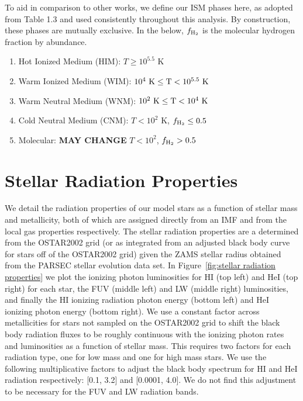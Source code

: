 \documentclass[twocolumn]{aastex61}
\begin{document}
To aid in comparison to other works, we define our ISM phases here, as adopted from \citet{Draine2011} Table 1.3 and used consistently throughout this analysis. By construction, these phases are mutually exclusive. In the below, $f_{\rm H_2}$ is the molecular hydrogen fraction by abundance.

\begin{enumerate}
\item Hot Ionized Medium (HIM): $T \geq 10^{5.5}$ K
\item Warm Ionized Medium (WIM): $10^{4}~\rm{K} \leq T < 10^{5.5}~\rm{K} $
\item Warm Neutral Medium (WNM): $10^{2}~\rm{K} \leq T < 10^{4}~ \rm{K}$
\item Cold Neutral Medium (CNM): $T < 10^2$ K, $f_{\rm H_2} \leq 0.5$
\item Molecular: \textbf{MAY CHANGE} $T < 10^2$, $f_{\rm H_2} > 0.5$
\end{enumerate}

\section{Stellar Radiation Properties}
\label{appendix:radiation}
We detail the radiation properties of our model stars as a function of stellar mass and metallicity, both of which are assigned directly from an IMF and from the local gas properties respectively. The stellar radiation properties are a determined from the OSTAR2002 grid \citep{Lanz2003} (or as integrated from an adjusted black body curve for stars off of the OSTAR2002 grid) given the ZAMS stellar radius obtained from the PARSEC \citep{Bressan2012,Tang2014} stellar evolution data set. In Figure~\ref{fig:stellar radiation properties} we plot the ionizing photon luminosities for HI (top left) and HeI (top right) for each star, the FUV (middle left) and LW (middle right) luminosities, and finally the HI ionizing radiation photon energy (bottom left) and HeI ionizing photon energy (bottom right). We use a constant factor across metallicities for stars not sampled on the OSTAR2002 grid to shift the black body radiation fluxes to be roughly continuous with the ionizing photon rates and luminosities as a function of stellar mass. This requires two factors for each radiation type, one for low mass and one for high mass stars. We use the following multiplicative factors to adjust the black body spectrum for HI and HeI radiation respectively: [0.1, 3.2] and [0.0001, 4.0]. We do not find this adjustment to be necessary for the FUV and LW radiation bands.
\end{document}
